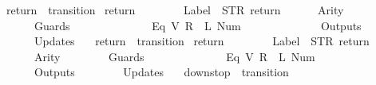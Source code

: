 \begin{isabellebody}
\isanewline
{}\isamarkupfalse%
\ {\isachardoublequoteopen}return{}{\isachardoublequoteclose}\ {\isacharcolon}{\isacharcolon}\ {\isachardoublequoteopen}transition{\isachardoublequoteclose}\ \isanewline
{\isachardoublequoteopen}return{}\ {\isasymequiv}\ {\isasymlparr}\isanewline
\ \ \ \ \ \ Label\ {\isacharequal}\ STR\ {\isacharprime}{\isacharprime}return{\isacharprime}{\isacharprime}{\isacharcomma}\isanewline
\ \ \ \ \ \ Arity\ {\isacharequal}\ {}{\isacharcomma}\isanewline
\ \ \ \ \ \ Guards\ {\isacharequal}\ {\isacharbrackleft}\isanewline
\ \ \ \ \ \ \ \ \ \ \ \ {\isacharparenleft}Eq\ {\isacharparenleft}V\ {\isacharparenleft}R\ {}{\isacharparenright}{\isacharparenright}\ {\isacharparenleft}L\ {\isacharparenleft}Num\ {}{\isacharparenright}{\isacharparenright}{\isacharparenright}\isanewline
\ \ \ \ \ \ {\isacharbrackright}{\isacharcomma}\isanewline
\ \ \ \ \ \ Outputs\ {\isacharequal}\ {\isacharbrackleft}{\isacharbrackright}{\isacharcomma}\isanewline
\ \ \ \ \ \ Updates\ {\isacharequal}\ {\isacharbrackleft}{\isacharbrackright}\isanewline
{\isasymrparr}{\isachardoublequoteclose}\isanewline
\isanewline
{}\isamarkupfalse%
\ {\isachardoublequoteopen}return{}{\isachardoublequoteclose}\ {\isacharcolon}{\isacharcolon}\ {\isachardoublequoteopen}transition{\isachardoublequoteclose}\ \isanewline
{\isachardoublequoteopen}return{}\ {\isasymequiv}\ {\isasymlparr}\isanewline
\ \ \ \ \ \ Label\ {\isacharequal}\ STR\ {\isacharprime}{\isacharprime}return{\isacharprime}{\isacharprime}{\isacharcomma}\isanewline
\ \ \ \ \ \ Arity\ {\isacharequal}\ {}{\isacharcomma}\isanewline
\ \ \ \ \ \ Guards\ {\isacharequal}\ {\isacharbrackleft}\isanewline
\ \ \ \ \ \ \ \ \ \ \ \ {\isacharparenleft}Eq\ {\isacharparenleft}V\ {\isacharparenleft}R\ {}{\isacharparenright}{\isacharparenright}\ {\isacharparenleft}L\ {\isacharparenleft}Num\ {}{\isacharparenright}{\isacharparenright}{\isacharparenright}\isanewline
\ \ \ \ \ \ {\isacharbrackright}{\isacharcomma}\isanewline
\ \ \ \ \ \ Outputs\ {\isacharequal}\ {\isacharbrackleft}{\isacharbrackright}{\isacharcomma}\isanewline
\ \ \ \ \ \ Updates\ {\isacharequal}\ {\isacharbrackleft}{\isacharbrackright}\isanewline
{\isasymrparr}{\isachardoublequoteclose}\isanewline
\isanewline
{}\isamarkupfalse%
\ {\isachardoublequoteopen}down{}{}stop{\isachardoublequoteclose}\ {\isacharcolon}{\isacharcolon}\ {\isachardoublequoteopen}transition{\isachardoublequoteclose}\ \isanewline

\end{isabellebody}
